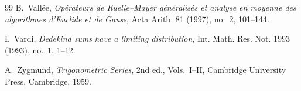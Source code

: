 \documentclass[11pt,a4paper]{amsart}
\theoremstyle{definition}
\theoremstyle{remark}
\begin{document}
\begin{thebibliography}{99}
B.~Vall\'ee,
\emph{Op\'erateurs de Ruelle--Mayer g\'en\'eralis\'es et analyse en moyenne
des algorithmes d'Euclide et de Gauss},
Acta Arith. 81 (1997), no.~2, 101--144.

I.~Vardi,
\emph{Dedekind sums have a limiting distribution},
Int. Math. Res. Not. 1993 (1993), no.~1, 1--12.

A.~Zygmund,
\emph{Trigonometric Series}, 2nd ed., Vols.~I--II,
Cambridge University Press, Cambridge, 1959.

\end{thebibliography}
\end{document}
